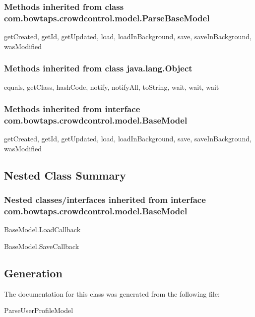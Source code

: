\subsubsection{Methods inherited from class com.bowtaps.crowdcontrol.model.ParseBaseModel}

getCreated, getId, getUpdated, load, loadInBackground, save, saveInBackground, wasModified\\

\subsubsection{Methods inherited from class java.lang.Object}

equals, getClass, hashCode, notify, notifyAll, toString, wait, wait, wait\\

\subsubsection{Methods inherited from interface com.bowtaps.crowdcontrol.model.BaseModel}

getCreated, getId, getUpdated, load, loadInBackground, save, saveInBackground, wasModified\\



\subsection{Nested Class Summary}

\subsubsection{Nested classes/interfaces inherited from interface com.bowtaps.crowdcontrol.model.BaseModel}
\begin{DoxyCompactItemize}
\item  \hypertarget{class_BaseModel.Android.LoadCallBack}{BaseModel.LoadCallback}
\item  \hypertarget{class_BaseModel.Android.SaveCallback}{BaseModel.SaveCallback}
\end{DoxyCompactItemize} 



\subsection{Generation}
The documentation for this class was generated from the following file\-:
\begin{DoxyCompactItemize}
\item ParseUserProfileModel
\end{DoxyCompactItemize} 









